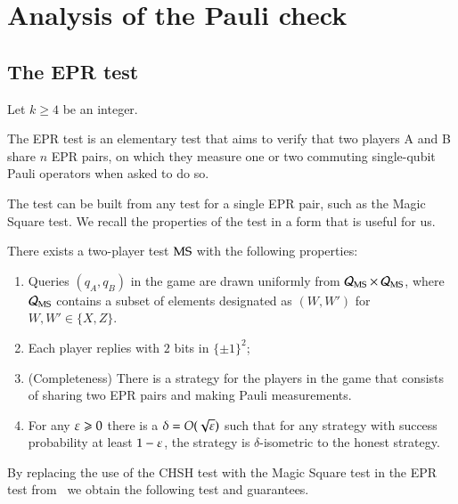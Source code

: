 \section{Analysis of the Pauli check}


\subsection{The EPR test}

Let $k\geq 4$ be an integer. 

The EPR test is an elementary test that aims to verify that two players A and B share $n$ EPR pairs, on which they measure one or two commuting single-qubit Pauli operators when asked to do so. 

The test can be built from any test for a single EPR pair, such as the Magic Square test. We recall the properties of the test in a form that is useful for us. 

\begin{theorem}\label{thm:ms-rigid}
There exists a two-player test $\textsc{MS}$ with the following properties:
\begin{enumerate}
\item Queries $(q_A,q_B)$ in the game are drawn uniformly from $\mathcal{Q}_{\textsc{MS}} \times \mathcal{Q}_{\textsc{MS}}$, where $\mathcal{Q}_{\textsc{MS}}$ contains a subset of elements designated as $(W,W')$ for $W,W'\in\{X,Z\}$. 
\item Each player replies with $2$ bits in $\{\pm 1\}^2$;
\item (Completeness) There is a strategy for the players in the game that consists of sharing two EPR pairs and making Pauli measurements. 
\item For any $\varepsilon\geqslant 0$ there is a $\delta = O(\sqrt{\varepsilon})$ such that
  for any strategy with success probability at least $1-\varepsilon$, the strategy is $\delta$-isometric to the honest strategy. 
\end{enumerate}
\end{theorem}

By replacing the use of the CHSH test with the Magic Square test in the EPR test from~\cite{reichardt} we obtain the following test and guarantees. 

